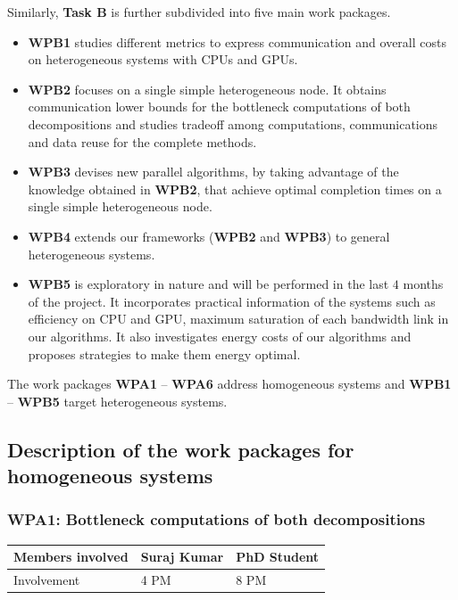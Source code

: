 \documentclass[a4paper,11pt]{article}
\begin{document}
	
	Similarly, \textbf{Task B} is further subdivided into five main work packages.
	\begin{itemize}
		\item \textbf{WPB1} studies different metrics to express communication and overall costs on heterogeneous systems with CPUs and GPUs.
		\item \textbf{WPB2} focuses on a single simple heterogeneous node. It obtains communication lower bounds for the bottleneck computations of both decompositions and studies tradeoff among computations, communications and data reuse for the complete methods.
		\item \textbf{WPB3} devises new parallel algorithms, by taking advantage of the knowledge obtained in \textbf{WPB2}, that achieve optimal completion times on a single simple heterogeneous node.
		\item \textbf{WPB4} extends our frameworks (\textbf{WPB2} and \textbf{WPB3}) to general heterogeneous systems.
		\item \textbf{WPB5} is exploratory in nature and will be performed in the last $4$ months of the project. It incorporates practical information of the systems such as efficiency on CPU and GPU, maximum saturation of each bandwidth link in our algorithms. It also investigates energy costs of our algorithms and proposes strategies to make them energy optimal.
	\end{itemize}
	
	
	
	

	
	
	
	The work packages \textbf{WPA1} -- \textbf{WPA6} address homogeneous systems and \textbf{WPB1} -- \textbf{WPB5} target heterogeneous systems.
	\vspace*{-0.15cm}\subsection{Description of the work packages for homogeneous systems}
	\label{sec:org:wp:homo}
	
	
	\subsubsection{\textbf{WPA1}: Bottleneck computations of both decompositions}
	\vspace*{-0.385cm}\begin{table}[H]
		\begin{tabular}{lll}
			\hline
			\cellcolor{blue2}
			Members involved & Suraj Kumar& PhD Student \\
			\hline
			\cellcolor{orange2}
			Involvement      & 4 PM            & 8 PM \\
			\hline
		\end{tabular}
	\end{table}\vspace*{-0.25cm}
	
\end{document}

